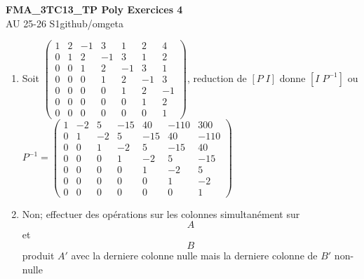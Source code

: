 \documentclass[12pt, a4paper]{article}
\newcommand{\mytitle}{FMA\_3TC13\_TP Poly Exercices 4}
\newcommand{\myauthor}{github/omgeta}
\newcommand{\mydate}{AU 25-26 S1}
\begin{document}
\raggedright
\footnotesize
\begin{center}
{\normalsize{\textbf{\mytitle}}} \\
{\footnotesize{\mydate\hspace{2pt}\textemdash\hspace{2pt}\myauthor}}
\end{center}
\begin{enumerate}[label=3.\arabic*., start=60]
  \item Soit $\left(\begin{array}{ccccccc} 1 & 2 & -1 & 3 & 1 & 2 & 4\\ 0 & 1 & 2 & -1 & 3 & 1 & 2\\ 0 & 0 & 1 & 2 & -1 & 3 & 1\\ 0 & 0 & 0 & 1 & 2 & -1 & 3\\ 0 & 0 & 0 & 0 & 1 & 2 & -1\\ 0 & 0 & 0 & 0 & 0 & 1 & 2\\ 0 & 0 & 0 & 0 & 0 & 0 & 1 \end{array}\right)$, reduction de $[P \; I]$ donne $[I \; P^{-1}]$ ou $P^{-1} = \left(\begin{array}{ccccccc} 1 & -2 & 5 & -15 & 40 & -110 & 300\\ 0 & 1 & -2 & 5 & -15 & 40 & -110\\ 0 & 0 & 1 & -2 & 5 & -15 & 40\\ 0 & 0 & 0 & 1 & -2 & 5 & -15\\ 0 & 0 & 0 & 0 & 1 & -2 & 5\\ 0 & 0 & 0 & 0 & 0 & 1 & -2\\ 0 & 0 & 0 & 0 & 0 & 0 & 1 \end{array}\right)$ 

  \item Non; effectuer des opérations sur les colonnes simultanément sur \[A\] et \[B\] produit $A'$ avec la derniere colonne nulle mais la derniere colonne de $B'$ non-nulle

\end{enumerate}
\end{document}
